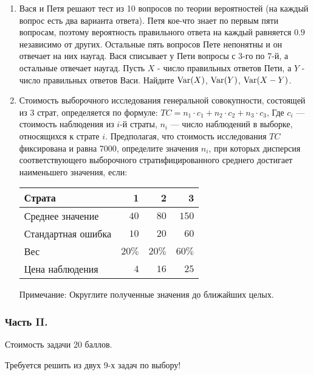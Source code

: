 \begin{enumerate}
\item Вася и Петя решают тест из 10 вопросов по теории вероятностей (на каждый
вопрос есть два варианта ответа). Петя кое-что знает по первым пяти вопросам,
поэтому вероятность правильного ответа на каждый равняется $0.9$ независимо от
других. Остальные пять вопросов Пете непонятны и он отвечает на них наугад. Вася
списывает у Пети вопросы с 3-го по 7-й, а остальные отвечает наугад.
Пусть $X$ - число правильных ответов Пети, а $Y$ - число правильных ответов Васи.
Найдите $\operatorname{Var}(X)$, $\operatorname{Var}(Y)$, $\operatorname{Var}(X-Y)$.

\item Стоимость выборочного исследования генеральной совокупности, состоящей из
3 страт, определяется по формуле: $TC=n_{1}\cdot c_{1}+n_{2}\cdot c_{2}+n_{3}\cdot c_{3}$,
Где $c_{i}$ — стоимость наблюдения из $i$-й страты, $n_{i}$ — число наблюдений
в выборке, относящихся к страте $i$. Предполагая, что стоимость исследования $TC$
фиксирована и равна 7000, определите значения $n_{i}$, при которых дисперсия
соответствующего выборочного стратифицированного среднего достигает наименьшего
значения, если:

\begin{center}
\begin{tabular}{@{}lrrr@{}}
\toprule
Страта             & 1     & 2     & 3     \\ \midrule
Среднее значение   & $40$  & $80$  & $150$ \\
Стандартная ошибка & $10$  & $20$  & $60$  \\
Вес                & $20\%$ & $20\%$ & $60\%$ \\
Цена наблюдения    & $4$   & $16$  & $25$  \\ \bottomrule
\end{tabular}
\end{center}

Примечание: Округлите полученные значения до ближайших целых.
\end{enumerate}

\subsubsection*{Часть II.}

Стоимость задачи 20 баллов.

Требуется решить \textbf{} из двух 9-х задач по выбору!

